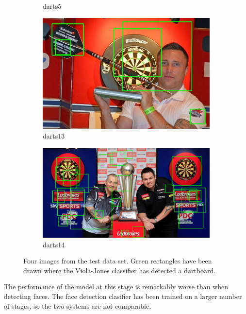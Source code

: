 \documentclass[conference]{IEEEtran}
\begin{document}
\begin{figure}[htb]
\begin{subfigure}{.5\linewidth}
  \caption{darts5}
  \label{fig:sub2}
\end{subfigure}
\begin{subfigure}{.5\linewidth}
  \centering
    \vspace{0.2cm}
  \includegraphics[width=.9\linewidth]{images/task2/detected13.jpg}
  \caption{darts13}
  \label{fig:sub1}
\end{subfigure}%
\begin{subfigure}{.5\linewidth}
  \centering
    \vspace{0.7cm}
  \includegraphics[width=.9\linewidth]{images/task2/detected14.jpg}
  \caption{darts14}
  \label{fig:sub2}
\end{subfigure}
\caption{Four images from the test data set. Green rectangles have been drawn where the Viola-Jones classifier has detected a dartboard.}
\end{figure}
\par
The performance of the model at this stage is remarkably worse than when detecting faces. The face detection clasifier has been trained on a larger number of stages, so the two systems are not comparable.  \newpage
\end{document}
